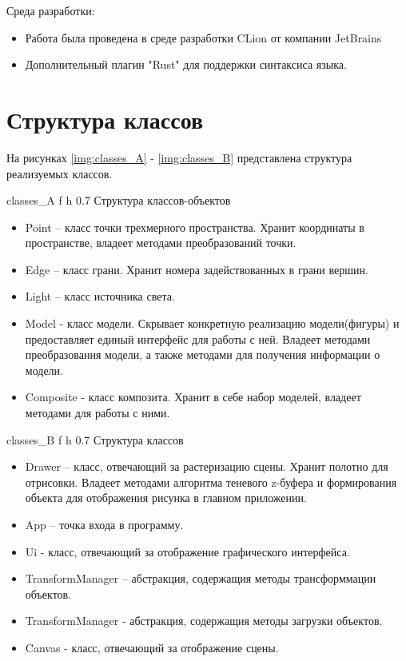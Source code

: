 Среда разработки:
\begin{itemize}
    \item Работа была проведена в среде разработки CLion\cite{clion} от компании JetBrains\cite{JB}
    \item Дополнительный плагин "Rust" для поддержки синтаксиса языка.
\end{itemize}

\section{Структура классов}

На рисунках \ref{img:classes_A} - \ref{img:classes_B} представлена структура реализуемых классов.

{classes_A} %
{f} %
{h} %
{0.7\textwidth} %
{Структура классов-объектов} %

\begin{itemize}
    \item Point – класс точки трехмерного пространства. Хранит координаты в пространстве, владеет методами преобразований точки.
    \item Edge – класс грани. Хранит номера задействованных в грани вершин.
    \item Light – класс источника света.
    \item Model - класс модели. Скрывает конкретную реализацию модели(фигуры) и предоставляет единый интерфейс для работы с ней. Владеет методами преобразования модели, а также методами для получения информации о модели.
    \item Composite - класс композита. Хранит в себе набор моделей, владеет методами для работы с ними.
\end{itemize}

{classes_B} %
{f} %
{h} %
{0.7\textwidth} %
{Структура классов} %

\begin{itemize}
    \item Drawer – класс, отвечающий за растеризацию сцены. Хранит полотно для отрисовки. Владеет методами алгоритма теневого z-буфера и формирования объекта для отображения рисунка в главном приложении.
    \item App – точка входа в программу.
    \item Ui - класс, отвечающий за отображение графического интерфейса.
    \item TransformManager – абстракция, содержащия методы трансформмации объектов.
    \item TransformManager - абстракция, содержащия методы загрузки объектов.
    \item Canvas - класс, отвечающий за отображение сцены.
\end{itemize}
